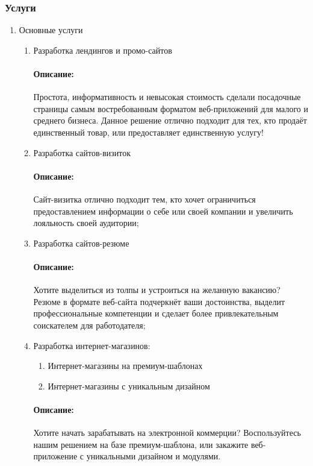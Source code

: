 \subsubsection{Услуги}
\begin{enumerate}
  \item Основные услуги
  \begin{enumerate}
    \item Разработка лендингов и промо-сайтов
      \paragraph{Описание:} Простота, информативность и невысокая стоимость сделали посадочные страницы самым востребованным форматом веб-приложений для малого и среднего бизнеса. Данное решение отлично подходит для тех, кто продаёт единственный товар, или предоставляет единственную услугу!

    \item Разработка сайтов-визиток
      \paragraph{Описание:} Сайт-визитка отлично подходит тем, кто хочет ограничиться предоставлением информации о себе или своей компании и увеличить лояльность своей аудитории;

    \item Разработка сайтов-резюме
      \paragraph{Описание:} Хотите выделиться из толпы и устроиться на желанную вакансию? Резюме в формате веб-сайта подчеркнёт ваши достоинства, выделит профессиональные компетенции и сделает более привлекательным соискателем для работодателя;

    \item Разработка интернет-магазинов:
      \begin{enumerate}
        \item Интернет-магазины на премиум-шаблонах
        \item Интернет-магазины с уникальным дизайном
      \end{enumerate}
      \paragraph{Описание:} Хотите начать зарабатывать на электронной коммерции? Воспользуйтесь нашим решением на базе премиум-шаблона, или закажите веб-приложение с уникальными дизайном и модулями.


\end{enumerate}
\end{enumerate}
